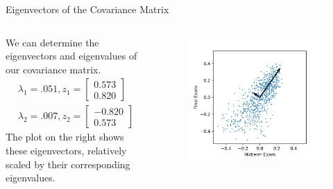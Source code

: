 \documentclass[aspectratio=169]{../latex_main/tntbeamer}  %
\begin{document}
	
	\begin{frame}{Eigenvectors of the Covariance Matrix}
	    \begin{columns}
	        \begin{column}{.5\textwidth}
	                We can determine the eigenvectors and eigenvalues of our covariance matrix.
	                \begin{align*}
	                    \lambda_1 = .051, z_1 = \left[\begin{array}{c}
	                             0.573\\
	                             0.820
	                    \end{array}\right]\\
	                    \lambda_2 = .007, z_2 = \left[\begin{array}{c}
	                             -0.820\\
	                             0.573
	                    \end{array}\right]
	                \end{align*}
	                The plot on the right shows these eigenvectors, relatively scaled by their corresponding eigenvalues.
	        \end{column}
	        
	        
	        \begin{column}{.5\textwidth}
	                \begin{figure}
	                    \centering
	                    \includegraphics[scale=.5]{Bild3}
	                \end{figure}
	        \end{column}
	    \end{columns}
	\end{frame}
\end{document}
